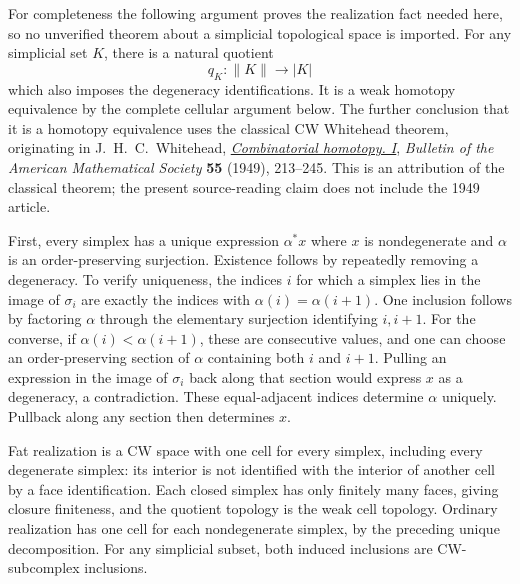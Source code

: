For completeness the following argument proves the realization fact
needed here, so no unverified theorem about a simplicial topological
space is imported. For any simplicial set $K$, there is a natural
quotient
\begin{equation}\tag{SRC12}
q_K:\|K\|\longrightarrow|K|
\end{equation}
which also imposes the degeneracy identifications. It is a weak
homotopy equivalence by the complete cellular argument below.
The further conclusion that it is a homotopy equivalence uses the
classical CW Whitehead theorem, originating in J.\ H.\ C.\ Whitehead,
\href{https://doi.org/10.1090/S0002-9904-1949-09175-9}
{\emph{Combinatorial homotopy. I}},
\emph{Bulletin of the American Mathematical Society} \textbf{55}
(1949), 213--245. This is an attribution of the classical theorem;
the present source-reading claim does not include the 1949 article.

First, every simplex has a unique expression $\alpha^*x$ where
$x$ is nondegenerate and $\alpha$ is an order-preserving surjection.
Existence follows by repeatedly removing a degeneracy. To verify
uniqueness, the indices $i$ for which a simplex lies in the image
of $\sigma_i$ are exactly the indices with
$\alpha(i)=\alpha(i+1)$. One inclusion follows by factoring
$\alpha$ through the elementary surjection identifying $i,i+1$.
For the converse, if $\alpha(i)<\alpha(i+1)$, these are consecutive
values, and one can choose an order-preserving section of $\alpha$
containing both $i$ and $i+1$. Pulling an expression in the image
of $\sigma_i$ back along that section would express $x$ as a
degeneracy, a contradiction. These equal-adjacent indices determine
$\alpha$ uniquely. Pullback along any section then determines $x$.

Fat realization is a CW space with one cell for every simplex,
including every degenerate simplex: its interior is not identified
with the interior of another cell by a face identification. Each
closed simplex has only finitely many faces, giving closure
finiteness, and the quotient topology is the weak cell topology.
Ordinary realization has one cell for each nondegenerate simplex,
by the preceding unique decomposition. For any simplicial subset,
both induced inclusions are CW-subcomplex inclusions.

